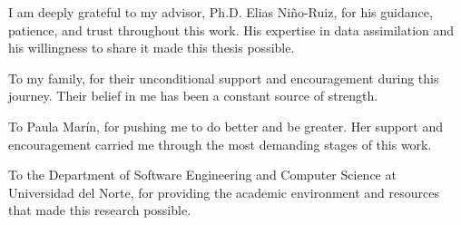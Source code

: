 \begin{acknowledgements}

I am deeply grateful to my advisor, Ph.D. Elias Ni\~no-Ruiz, for his guidance, patience, and trust throughout this work. His expertise in data assimilation and his willingness to share it made this thesis possible.

To my family, for their unconditional support and encouragement during this journey. Their belief in me has been a constant source of strength.

To Paula Mar\'in, for pushing me to do better and be greater. Her support and encouragement carried me through the most demanding stages of this work.

To the Department of Software Engineering and Computer Science at Universidad del Norte, for providing the academic environment and resources that made this research possible.

\end{acknowledgements}
